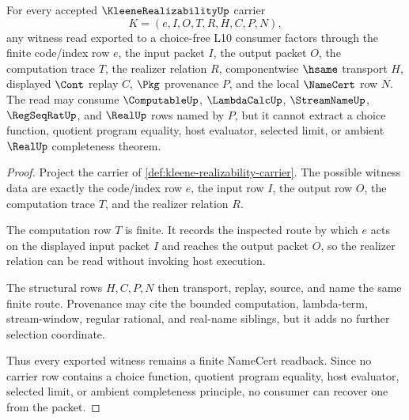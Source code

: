 \begin{theorem}
\label{thm:kleene-realizability-finite-witness-readback}
For every accepted $\KleeneRealizabilityUp$ carrier
$$
K=(e,I,O,T,R,H,C,P,N),
$$
any witness read exported to a choice-free L10 consumer factors through the finite code/index row $e$, the input packet $I$, the output packet $O$, the computation trace $T$, the realizer relation $R$, componentwise $\hsame$ transport $H$, displayed $\Cont$ replay $C$, $\Pkg$ provenance $P$, and the local $\NameCert$ row $N$. The read may consume $\ComputableUp$, $\LambdaCalcUp$, $\StreamNameUp$, $\RegSeqRatUp$, and $\RealUp$ rows named by $P$, but it cannot extract a choice function, quotient program equality, host evaluator, selected limit, or ambient $\RealUp$ completeness theorem.
\end{theorem}
\begin{proof}
Project the carrier of \autoref{def:kleene-realizability-carrier}. The possible witness data are exactly the code/index row $e$, the input row $I$, the output row $O$, the computation trace $T$, and the realizer relation $R$.

The computation row $T$ is finite. It records the inspected route by which $e$ acts on the displayed input packet $I$ and reaches the output packet $O$, so the realizer relation can be read without invoking host execution.

The structural rows $H,C,P,N$ then transport, replay, source, and name the same finite route. Provenance may cite the bounded computation, lambda-term, stream-window, regular rational, and real-name siblings, but it adds no further selection coordinate.

Thus every exported witness remains a finite NameCert readback. Since no carrier row contains a choice function, quotient program equality, host evaluator, selected limit, or ambient completeness principle, no consumer can recover one from the packet.
\end{proof}

